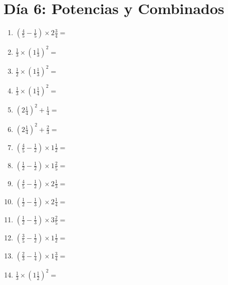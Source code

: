 \documentclass[12pt]{article}
\begin{document}
\section*{Día 6: Potencias y Combinados}
\begin{enumerate}
\item \large $ \left( \frac{4}{5} - \frac{1}{5} \right) \times 2 \frac{3}{4} = $ \vspace{1.6cm}
\item \large $ \frac{1}{3} \times \left( 1 \frac{1}{3} \right)^2 = $ \vspace{1.6cm}
\item \large $ \frac{1}{2} \times \left( 1 \frac{1}{3} \right)^2 = $ \vspace{1.6cm}
\item \large $ \frac{1}{3} \times \left( 1 \frac{1}{4} \right)^2 = $ \vspace{1.6cm}
\item \large $ \left( 2 \frac{1}{4} \right)^2 + \frac{1}{4} = $ \vspace{1.6cm}
\item \large $ \left( 2 \frac{1}{4} \right)^2 + \frac{2}{3} = $ \vspace{1.6cm}
\item \large $ \left( \frac{4}{5} - \frac{1}{2} \right) \times 1 \frac{1}{2} = $ \vspace{1.6cm}
\item \large $ \left( \frac{1}{2} - \frac{1}{2} \right) \times 1 \frac{2}{5} = $ \vspace{1.6cm}
\item \large $ \left( \frac{4}{5} - \frac{1}{2} \right) \times 2 \frac{1}{3} = $ \vspace{1.6cm}
\item \large $ \left( \frac{1}{2} - \frac{1}{3} \right) \times 2 \frac{1}{4} = $ \vspace{1.6cm}
\newpage
\item \large $ \left( \frac{1}{2} - \frac{1}{3} \right) \times 3 \frac{2}{5} = $ \vspace{1.6cm}
\item \large $ \left( \frac{3}{5} - \frac{1}{2} \right) \times 1 \frac{1}{2} = $ \vspace{1.6cm}
\item \large $ \left( \frac{2}{3} - \frac{1}{4} \right) \times 1 \frac{3}{4} = $ \vspace{1.6cm}
\item \large $ \frac{1}{3} \times \left( 1 \frac{1}{2} \right)^2 = $ \vspace{1.6cm}

\end{enumerate}
\end{document}
